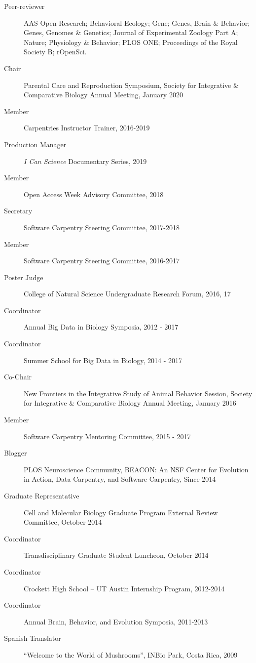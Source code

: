 \documentclass[margin,line]{CV}
\begin{document}
\begin{resume}
\begin{description}
\item[Peer-reviewer] AAS Open Research; Behavioral Ecology; Gene; Genes, Brain \& Behavior; Genes, Genomes \& Genetics; Journal of Experimental Zoology Part A; Nature; Physiology \& Behavior; PLOS ONE; Proceedings of the Royal Society B; rOpenSci. 
\item[Chair] Parental Care and Reproduction Symposium, Society for Integrative \& Comparative Biology Annual Meeting, January 2020
\item[Member] Carpentries Instructor Trainer, 2016-2019
\item[Production Manager] \textit{I Can Science} Documentary Series, 2019 
\item[Member] Open Access Week Advisory Committee, 2018
\item[Secretary] Software Carpentry Steering Committee, 2017-2018
\item[Member] Software Carpentry Steering Committee, 2016-2017
\item[Poster Judge] College of Natural Science Undergraduate Research Forum, 2016, 17
\item[Coordinator] Annual Big Data in Biology Symposia, 2012 - 2017 
\item[Coordinator] Summer School for Big Data in Biology, 2014 - 2017
\item[Co-Chair] New Frontiers in the Integrative Study of Animal Behavior Session, Society for Integrative \& Comparative Biology Annual Meeting, January 2016
\item[Member] Software Carpentry Mentoring Committee, 2015 - 2017
\item[Blogger] PLOS Neuroscience Community, BEACON: An NSF Center for Evolution in Action, Data Carpentry, and Software Carpentry, Since 2014
\item[Graduate Representative] Cell and Molecular Biology Graduate Program External Review Committee, October 2014 
\item[Coordinator] Transdisciplinary Graduate Student Luncheon, October 2014
\item[Coordinator] Crockett High School – UT Austin Internship Program, 2012-2014
\item[Coordinator] Annual Brain, Behavior, and Evolution Symposia, 2011-2013
\item[Spanish Translator] “Welcome to the World of Mushrooms”, INBio Park, Costa Rica, 2009
\end{description}


\end{resume}
\end{document}
